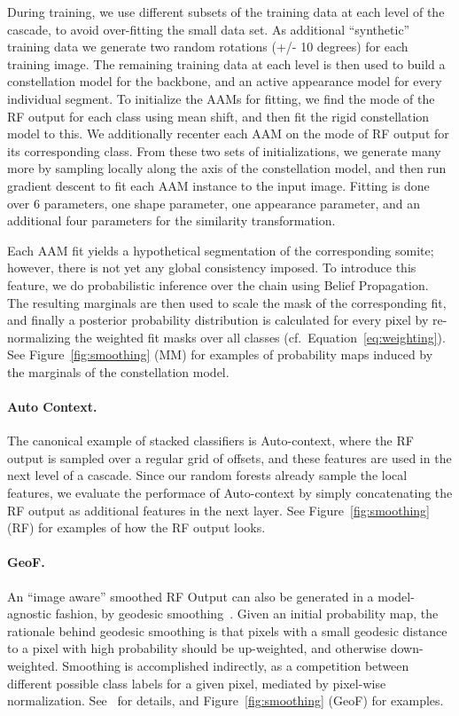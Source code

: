 \documentclass[10pt,twocolumn,letterpaper]{article}
\begin{document}
During training, we use different subsets of the training data at each level of the cascade, to avoid over-fitting the small data set. As additional ``synthetic'' training data we generate two random rotations (+/- 10 degrees) for each training image.  The remaining training data at each level is then used to build a constellation model for the backbone, and an active appearance model for every individual segment.  To initialize the AAMs for fitting, we find the mode of the RF output for each class using mean shift, and then fit the rigid constellation model to this.  We additionally recenter each AAM on the mode of RF output for its corresponding class.  From these two sets of initializations, we generate many more by sampling locally along the axis of the constellation model, and then run gradient descent to fit each AAM instance to the input image.  Fitting is done over 6 parameters, one shape parameter, one appearance parameter, and an additional four parameters for the similarity transformation.

Each AAM fit yields a hypothetical segmentation of the corresponding somite; however, there is not yet any global consistency imposed.  To introduce this feature, we do probabilistic inference over the chain using Belief Propagation.  The resulting marginals are then used to scale the mask of the corresponding fit, and finally a posterior probability distribution is calculated for every pixel by re-normalizing the weighted fit masks over all classes (cf.\ Equation~\eqref{eq:weighting}).  See Figure~\ref{fig:smoothing} (MM) for examples of probability maps induced by the marginals of the constellation model.

\paragraph{Auto Context. }
The canonical example of stacked classifiers is Auto-context, where the RF output is sampled over a regular grid of offsets, and these features are used in the next level of a cascade.  Since our random forests already sample the local features, we evaluate the performace of Auto-context by simply concatenating the RF output as additional features in the next layer.  See Figure~\ref{fig:smoothing} (RF) for examples of how the RF output looks.

\paragraph{GeoF. }
An ``image aware'' smoothed RF Output can also be generated in a model-agnostic fashion, by geodesic smoothing~\cite{GeoForests2013}. 
Given an initial probability map, the rationale behind geodesic smoothing is that pixels with a small geodesic distance to a pixel with high probability should be up-weighted, and otherwise down-weighted. Smoothing is accomplished indirectly, as a competition between different possible class labels for a given pixel, mediated by pixel-wise normalization. See~\cite{GeoForests2013} for details, and Figure~\ref{fig:smoothing} (GeoF) for examples.
\end{document}
